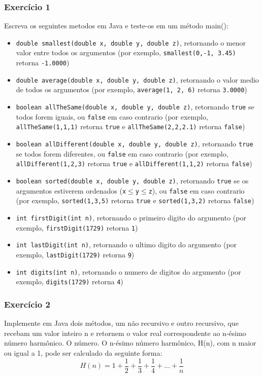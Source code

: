 \documentclass[xcolor={dvipsnames,table},aspectratio=169]{beamer}
\begin{document}
\begin{frame}[fragile]\frametitle{Exercício 1}
{\scriptsize
Escreva os seguintes metodos em Java e teste-os em um método main():
\begin{itemize}
\item \texttt{double smallest(double x, double y, double z)}, retornando o menor valor entre todos os argumentos (por exemplo, \texttt{smallest(0,-1, 3.45)} retorna \texttt{-1.0000})
\item \texttt{double average(double x, double y, double z)}, retornando o valor medio de todos os argumentos (por exemplo, \texttt{average(1, 2, 6)} retorna \texttt{3.0000})
\item \texttt{boolean allTheSame(double x, double y, double z)}, retornando \texttt{true} se todos forem iguais, ou \texttt{false} em caso contrario (por exemplo, \texttt{allTheSame(1,1,1)} retorna \texttt{true} e \texttt{allTheSame(2,2,2.1)} retorna \texttt{false})
\item \texttt{boolean allDifferent(double x, double y, double z)}, retornando \texttt{true} se todos forem diferentes, ou \texttt{false} em caso contrario (por exemplo, \texttt{allDifferent(1,2,3)} retorna \texttt{true} e \texttt{allDifferent(1,1,2)} retorna \texttt{false})
\item \texttt{boolean sorted(double x, double y, double z)}, retornando \texttt{true} se os argumentos estiverem ordenados (\texttt{x}$\leqslant$\texttt{y}$\leqslant$\texttt{z}), ou \texttt{false} em caso contrario (por exemplo, \texttt{sorted(1,3,5)} retorna \texttt{true} e \texttt{sorted(1,3,2)} retorna \texttt{false})
\item \texttt{int firstDigit(int n)}, retornando o primeiro digito do argumento (por exemplo, \texttt{firstDigit(1729)} retorna \texttt{1})
\item \texttt{int lastDigit(int n)}, retornando o ultimo digito do argumento (por exemplo, \texttt{lastDigit(1729)} retorna \texttt{9})
\item \texttt{int digits(int n)}, retornando o numero de digitos do argumento (por exemplo, \texttt{digits(1729)} retorna \texttt{4})
\end{itemize}
}
\end{frame}

\begin{frame}[fragile]\frametitle{Exercício 2}
Implemente em Java dois métodos, um não recursivo e outro recursivo, que recebam um valor inteiro n e retornem o valor real correspondente ao n-ésimo número harmônico.
O número. O n-ésimo número harmônico, H(n), com n maior ou igual a 1, pode ser calculado da seguinte forma:
\[ H(n) = 1 + \frac{1}{2} + \frac{1}{3} +\frac{1}{4} + ... + \frac{1}{n}\]
\end{frame}
\end{document}
